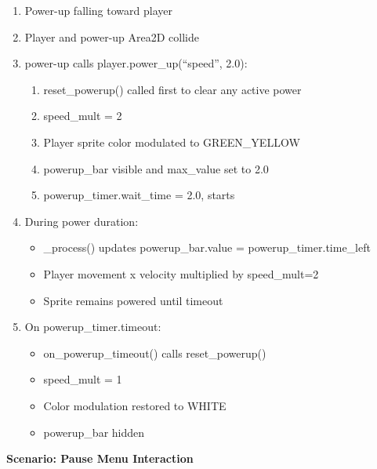 \documentclass{article}
\begin{document}
\begin{enumerate}
    \item Power-up falling toward player
    \item Player and power-up Area2D collide
    \item power-up calls player.power\_up(``speed'', 2.0):
    \begin{enumerate}
        \item reset\_powerup() called first to clear any active power
        \item speed\_mult = 2
        \item Player sprite color modulated to GREEN\_YELLOW
        \item powerup\_bar visible and max\_value set to 2.0
        \item powerup\_timer.wait\_time = 2.0, starts
    \end{enumerate}
    \item During power duration:
    \begin{itemize}
        \item \_process() updates powerup\_bar.value = powerup\_timer.time\_left
        \item Player movement x velocity multiplied by speed\_mult=2
        \item Sprite remains powered until timeout
    \end{itemize}
    \item On powerup\_timer.timeout:
    \begin{itemize}
        \item on\_powerup\_timeout() calls reset\_powerup()
        \item speed\_mult = 1
        \item Color modulation restored to WHITE
        \item powerup\_bar hidden
    \end{itemize}
\end{enumerate}

\textbf{Scenario: Pause Menu Interaction}
\end{document}
